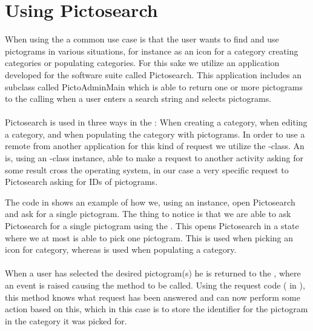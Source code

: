 
\section{Using Pictosearch}
\label{sec:using_pictosearch}

When using the \ct a common use case is that the user wants to find and use pictograms in various situations, for instance as an icon for a category creating categories or populating categories. For this sake we utilize an application developed for the \giraf software suite called Pictosearch. This application includes an  subclass called PictoAdminMain  which is able to return one or more pictograms to the calling  when a user enters a search string and selects pictograms. 
\\\\
Pictosearch is used in three ways in the \ct: When creating a category, when editing a category, and when populating the category with pictograms. In order to use a remote  from another application for this kind of request we utilize the -class. An  is, using an -class instance, able to make a request to another activity asking for some result cross the operating system, in our case a very specific request to Pictosearch asking for IDs of pictograms. 



The code in  shows an example of how we, using an  instance, open Pictosearch and ask for a single pictogram. The thing to notice is that we are able to ask Pictosearch for a single pictogram using the . This opens Pictosearch in a state where we at most is able to pick one pictogram. This is used when picking an icon for category, whereas  is used when populating a category. 
\\\\
When a user has selected the desired pictogram(s) he is returned to the \ct, where an event is raised causing the method  to be called. Using the request code ( in ), this method knows what request has been answered and can now perform some action based on this, which in this case is to store the identifier for the pictogram in the category it was picked for.

